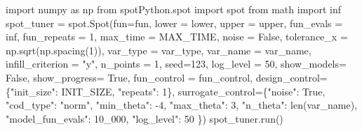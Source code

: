 \documentclass[
  letterpaper,
  DIV=11,
  numbers=noendperiod]{scrreprt}
\newenvironment{Shaded}{\begin{snugshade}}{\end{snugshade}}
\newcommand{\BuiltInTok}[1]{\textcolor[rgb]{0.00,0.23,0.31}{#1}}
\newcommand{\DecValTok}[1]{\textcolor[rgb]{0.68,0.00,0.00}{#1}}
\newcommand{\ImportTok}[1]{\textcolor[rgb]{0.00,0.46,0.62}{#1}}
\newcommand{\NormalTok}[1]{\textcolor[rgb]{0.00,0.23,0.31}{#1}}
\newcommand{\OperatorTok}[1]{\textcolor[rgb]{0.37,0.37,0.37}{#1}}
\newcommand{\StringTok}[1]{\textcolor[rgb]{0.13,0.47,0.30}{#1}}
\newcommand{\VariableTok}[1]{\textcolor[rgb]{0.07,0.07,0.07}{#1}}
\begin{document}
\begin{Shaded}
\begin{Highlighting}[]
\ImportTok{import}\NormalTok{ numpy }\ImportTok{as}\NormalTok{ np}
\ImportTok{from}\NormalTok{ spotPython.spot }\ImportTok{import}\NormalTok{ spot}
\ImportTok{from}\NormalTok{ math }\ImportTok{import}\NormalTok{ inf}
\NormalTok{spot\_tuner }\OperatorTok{=}\NormalTok{ spot.Spot(fun}\OperatorTok{=}\NormalTok{fun,}
\NormalTok{                   lower }\OperatorTok{=}\NormalTok{ lower,}
\NormalTok{                   upper }\OperatorTok{=}\NormalTok{ upper,}
\NormalTok{                   fun\_evals }\OperatorTok{=}\NormalTok{ inf,}
\NormalTok{                   fun\_repeats }\OperatorTok{=} \DecValTok{1}\NormalTok{,}
\NormalTok{                   max\_time }\OperatorTok{=}\NormalTok{ MAX\_TIME,}
\NormalTok{                   noise }\OperatorTok{=} \VariableTok{False}\NormalTok{,}
\NormalTok{                   tolerance\_x }\OperatorTok{=}\NormalTok{ np.sqrt(np.spacing(}\DecValTok{1}\NormalTok{)),}
\NormalTok{                   var\_type }\OperatorTok{=}\NormalTok{ var\_type,}
\NormalTok{                   var\_name }\OperatorTok{=}\NormalTok{ var\_name,}
\NormalTok{                   infill\_criterion }\OperatorTok{=} \StringTok{"y"}\NormalTok{,}
\NormalTok{                   n\_points }\OperatorTok{=} \DecValTok{1}\NormalTok{,}
\NormalTok{                   seed}\OperatorTok{=}\DecValTok{123}\NormalTok{,}
\NormalTok{                   log\_level }\OperatorTok{=} \DecValTok{50}\NormalTok{,}
\NormalTok{                   show\_models}\OperatorTok{=} \VariableTok{False}\NormalTok{,}
\NormalTok{                   show\_progress}\OperatorTok{=} \VariableTok{True}\NormalTok{,}
\NormalTok{                   fun\_control }\OperatorTok{=}\NormalTok{ fun\_control,}
\NormalTok{                   design\_control}\OperatorTok{=}\NormalTok{\{}\StringTok{"init\_size"}\NormalTok{: INIT\_SIZE,}
                                   \StringTok{"repeats"}\NormalTok{: }\DecValTok{1}\NormalTok{\},}
\NormalTok{                   surrogate\_control}\OperatorTok{=}\NormalTok{\{}\StringTok{"noise"}\NormalTok{: }\VariableTok{True}\NormalTok{,}
                                      \StringTok{"cod\_type"}\NormalTok{: }\StringTok{"norm"}\NormalTok{,}
                                      \StringTok{"min\_theta"}\NormalTok{: }\OperatorTok{{-}}\DecValTok{4}\NormalTok{,}
                                      \StringTok{"max\_theta"}\NormalTok{: }\DecValTok{3}\NormalTok{,}
                                      \StringTok{"n\_theta"}\NormalTok{: }\BuiltInTok{len}\NormalTok{(var\_name),}
                                      \StringTok{"model\_fun\_evals"}\NormalTok{: }\DecValTok{10\_000}\NormalTok{,}
                                      \StringTok{"log\_level"}\NormalTok{: }\DecValTok{50}
\NormalTok{                                      \})}
\NormalTok{spot\_tuner.run()}
\end{Highlighting}
\end{Shaded}
\end{document}
